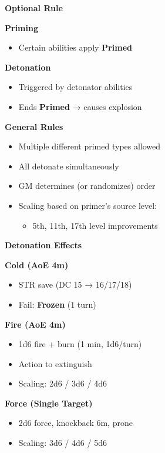 \begin{scifitablebox}[screenbox,title=\textcolor{PanelGlow}{Primers \& Detonators (Quick Reference)}]

\textbf{Optional Rule}

\textbf{Priming}
\begin{itemize}
\item Certain abilities apply \textbf{Primed}
\end{itemize}

\textbf{Detonation}
\begin{itemize}
\item Triggered by detonator abilities
\item Ends \textbf{Primed} → causes explosion
\end{itemize}

\textbf{General Rules}
\begin{itemize}
\item Multiple different primed types allowed
\item All detonate simultaneously
\item GM determines (or randomizes) order
\item Scaling based on primer's source level:
\begin{itemize}
\item 5th, 11th, 17th level improvements
\end{itemize}
\end{itemize}

\textbf{Detonation Effects}

\textbf{Cold (AoE 4m)}
\begin{itemize}
\item STR save (DC 15 → 16/17/18)
\item Fail: \textbf{Frozen} (1 turn)
\end{itemize}

\textbf{Fire (AoE 4m)}
\begin{itemize}
\item 1d6 fire + burn (1 min, 1d6/turn)
\item Action to extinguish
\item Scaling: 2d6 / 3d6 / 4d6
\end{itemize}

\textbf{Force (Single Target)}
\begin{itemize}
\item 2d6 force, knockback 6m, prone
\item Scaling: 3d6 / 4d6 / 5d6
\end{itemize}


\end{scifitablebox}

